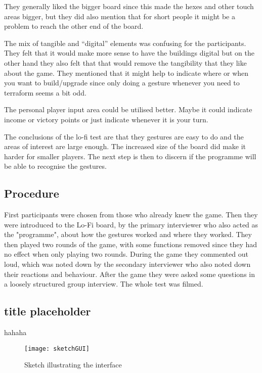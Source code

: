 They generally liked the bigger board since this made the hexes and other touch areas bigger, but they did also mention that for short people it might be a problem to reach the other end of the board. 

The mix of tangible and “digital” elements was confusing for the participants. They felt that it would make more sense to have the buildings digital but on the other hand they also felt that that would remove the tangibility that they like about the game. They mentioned that it might help to indicate where or when you want to build/upgrade since only doing a gesture whenever you need to terraform seems a bit odd. 

The personal player input area could be utilised better. Maybe it could indicate income or victory points or just indicate whenever it is your turn. 

The conclusions of the lo-fi test are that they gestures are easy to do and the areas of interest are large enough. The increased size of the board did make it harder for smaller players. The next step is then to discern if the programme will be able to recognise the gestures. 

\subsection{Procedure}
First participants were chosen from those who already knew the game.
Then they were introduced to the Lo-Fi board, by the primary interviewer who also acted as the "programme", about how the gestures worked and where they worked. They then played two rounds of the game, with some functions removed since they had no effect when only playing two rounds. During the game they commented out loud, which was noted down by the secondary interviewer who also noted down their reactions and behaviour. 
After the game they were asked some questions in a loosely structured group interview. 
The whole test was filmed.

\subsection{title placeholder} 
hahaha

\begin{figure}
\centering
\texttt{[image: sketchGUI]}
\caption{Sketch illustrating the interface}
\end{figure}